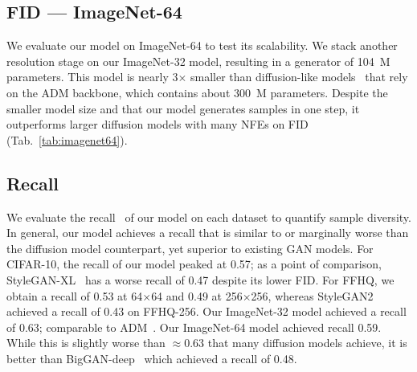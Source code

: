 \vspace{-0.1cm}
\subsection{FID --- ImageNet-64~\cite{chrabaszcz2017downsampled}}
We evaluate our model on ImageNet-64 to test its scalability. We stack another resolution stage on our ImageNet-32 model, resulting in a generator of 104\ M parameters. This model is nearly 3$\times$ smaller than diffusion-like models~\cite{adm,edm,cm,icm} that rely on the ADM backbone, which contains about 300\ M parameters. Despite the smaller model size and that our model generates samples in one step, it outperforms larger diffusion models with many NFEs on FID (Tab.~\ref{tab:imagenet64}).

\vspace{-0.1cm}
\subsection{Recall}
We evaluate the recall~\cite{precrecall} of our model on each dataset to quantify sample diversity. In general, our model achieves a recall that is similar to or marginally worse than the diffusion model counterpart, yet superior to existing GAN models. For CIFAR-10, the recall of our model peaked at 0.57; as a point of comparison, StyleGAN-XL~\cite{sgxl} has a worse recall of 0.47 despite its lower FID. For FFHQ, we obtain a recall of 0.53 at 64$\times$64 and 0.49 at 256$\times$256, whereas StyleGAN2~\cite{sg2} achieved a recall of 0.43 on FFHQ-256. Our ImageNet-32 model achieved a recall of 0.63; comparable to ADM~\cite{adm}. Our ImageNet-64 model achieved recall 0.59. While this is slightly worse than $\approx$0.63 that many diffusion models achieve, it is better than BigGAN-deep~\cite{biggan} which achieved a recall of 0.48.

